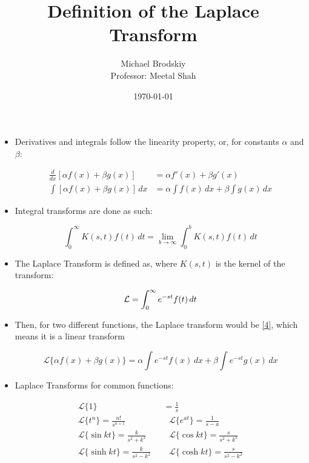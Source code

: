 \documentclass[12pt]{article}
\title{Definition of the Laplace Transform}
\date{\today}
\author{Michael Brodskiy\\ \small Professor: Meetal Shah}
\begin{document}
\maketitle

\begin{itemize}

  \item Derivatives and integrals follow the linearity property, or, for constants $\alpha$ and $\beta$:

    \begin{equation}
      \begin{split}
        \frac{d}{dx}[\alpha f(x) + \beta g(x)]&=\alpha f'(x) + \beta g'(x)\\
        \int[\alpha f(x) + \beta g(x)]\,dx&=\alpha \int f(x)\,dx+\beta\int g(x)\,dx
      \end{split}
      \label{1}
    \end{equation}

  \item Integral transforms are done as such:

    \begin{equation}
      \int_0^{\infty} K(s,t)f(t)\,dt=\lim_{b\to\infty}\int_0^b K(s,t)f(t)\,dt
      \label{2}
    \end{equation}

  \item The Laplace Transform is defined as, where $K(s,t)$ is the kernel of the transform:

    \begin{equation}
      \mathcal{L} =\int_0^{\infty}e^{-st}f(t)\,dt\\
      \label{3}
    \end{equation}

  \item Then, for two different functions, the Laplace transform would be \eqref{4}, which means it is a linear transform

    \begin{equation}
      \mathcal{L}\{\alpha f(x) + \beta g(x)\}=\alpha \int e^{-st}f(x)\,dx+\beta\int e^{-st}g(x)\,dx
      \label{4}
    \end{equation}

  \item Laplace Transforms for common functions:

    \begin{equation}
      \begin{split}
        \mathcal{L}\{1\}&=\frac{1}{s}\\
        \mathcal{L}\{t^n\}=\frac{n!}{s^{n+1}}\,\,\,\,&\,\,\,\, \mathcal{L}\{e^{at}\}=\frac{1}{s-a}\\
        \mathcal{L}\{\sin kt\}=\frac{k}{s^2+k^2}\,\,\,\,&\,\,\,\, \mathcal{L}\{\cos kt\}=\frac{s}{s^2+k^2}\\
        \mathcal{L}\{\sinh kt\}=\frac{k}{s^2-k^2}\,\,\,\,&\,\,\,\, \mathcal{L}\{\cosh kt\}=\frac{s}{s^2-k^2}\\
      \end{split}
      \label{5}
    \end{equation}


\end{itemize}
\end{document}

